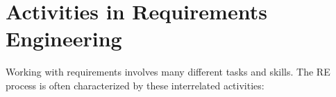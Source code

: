 \newpage
\section{Activities in Requirements Engineering}%
%
\MarginPage{%

 
}%
%
Working with requirements involves many different tasks and skills. The RE process is often characterized by these interrelated activities: 

